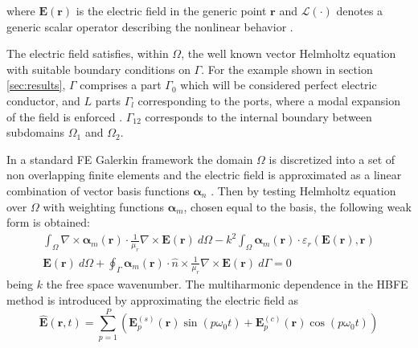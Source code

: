 \documentclass[journal]{IEEEtran}
\renewcommand{\vec}[1]{\mathbf{#1}}
\begin{document}
\noindent where $\vec{E}(\vec{r})$ is the electric field in the generic point
$\vec{r}$ and $\mathcal{L}(\cdot)$ denotes a generic scalar operator describing the
nonlinear behavior \cite{Guarnieri2010}. 

The electric field satisfies, within $\Omega$, the well known vector Helmholtz
equation\cite{Pelosi2009}
%
 with suitable boundary conditions on $\Gamma$. For the example shown in section \ref{sec:results}, $\Gamma$
comprises a part $\Gamma_0$ which will be considered perfect electric conductor, and $L$ parts $\Gamma_l$
corresponding to the ports, where a modal expansion of the field is enforced \cite{Pelosi2009}. 
$\Gamma_{12}$ corresponds to the internal boundary between subdomains $\Omega_1$ and $\Omega_2$.

In a standard FE Galerkin framework the domain $\Omega$ is
discretized into a set of non overlapping finite elements and the electric
field is approximated as a linear combination of vector basis functions
$\boldsymbol{\alpha}_n$ \cite{Pelosi2009}.
%
Then by testing 
Helmholtz equation over $\Omega$ with weighting functions
 $\boldsymbol{\alpha}_m$, chosen equal to the basis, the following weak form is
 obtained:
%
\begin{multline}\label{eq:fem}
\int_\Omega \nabla \times \boldsymbol{\alpha}_m (\vec{r}) \cdot \frac{1}{\mu_r}
\nabla \times \vec{E}(\vec{r}) \ d\Omega 
- k^2 \int_\Omega \boldsymbol{\alpha}_m (\vec{r}) \cdot \varepsilon_r 
(\vec{E}(\vec{r}), \vec{r})  \\ 
  \vec{E}(\vec{r}) \ d\Omega
+ \oint_{\Gamma} \boldsymbol{\alpha}_m (\vec{r}) \cdot \hat{n} \times \frac{1}{\mu_r} 
\nabla \times \vec{E}(\vec{r}) \ d\Gamma = 0
\end{multline} 
\noindent being $k$ the free
space wavenumber. The multiharmonic dependence in the HBFE method is introduced
by approximating the electric field as \cite{Copeland2010}
%
\begin{equation} \label{eq:field}
\vec{\hat{E}}(\vec{r}, t) = \sum^P_{p=1} \left( \vec{E}_{p}^{(s)}(\vec{r}) \sin(p
\omega_0 t) + \vec{E}_p^{(c)}(\vec{r}) \cos(p \omega_0 t) \right)
\end{equation} 
\end{document}
